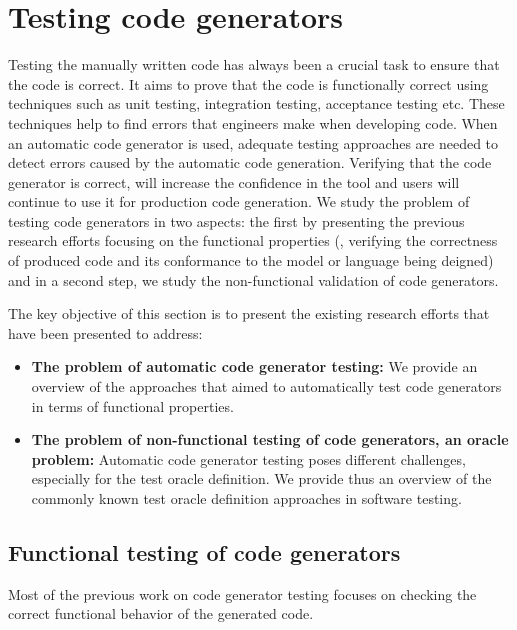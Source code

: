 \section{Testing code generators}
\label{sec:Testing code generators}
Testing the manually written code has always been a crucial task to ensure that the code is correct. It aims to prove that the code is functionally correct using techniques such as unit testing, integration testing, acceptance testing etc. These techniques help to find errors that engineers make when developing code.
When an automatic code generator is used, adequate testing approaches are needed to detect errors caused by the automatic code generation. Verifying that the code generator is correct, will increase the confidence in the tool and users will continue to use it for production code generation. 
We study the problem of testing code generators in two aspects: the first by presenting the previous research efforts focusing on the functional properties (\ie, verifying the correctness of produced code and its conformance to the model or language being deigned) and in a second step, we study the non-functional validation of code generators. 

The key objective of this section is to present the existing research efforts that have been presented to address:
\begin{itemize}
	\item \textbf{The problem of automatic code generator testing:}  We provide an overview of the approaches that aimed to automatically test code generators in terms of functional properties.
	
	\item \textbf{The problem of non-functional testing of code generators, an oracle problem:} Automatic code generator testing poses different challenges, especially for the test oracle definition. We provide thus an overview of the commonly known test oracle definition approaches in software testing. 
\end{itemize}

\subsection{Functional testing of code generators}
\label{sec: Functional testing of code generators}

Most of the previous work on code generator testing focuses on checking the correct functional behavior of the generated code\cite{stuermer2007systematic,zelenov2006automatic,conrad2009testing,conrad2010code,jorges2014back,burnard2004verifying,sturmer2003test}. 

